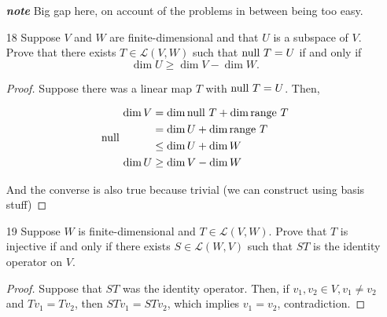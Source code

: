 \begin{enumerate}
\begin{proof}
        The specific non-zero value can be defined using basis stuff, but the details are not too important here. What \emph{is} important is that null and range are both subspaces, so by swapping which is 0 and which is non-zero, we will keep these subspaces.
        
        $\lrange T_2 = \lnull T_1$. $T_2$ will also be not injective because we swap range and null, and we specify that the range of $T_1$ must be non-zero. Now the null space of $(T_1 + T_2) = \{0\}$, which is injective, so we have our proof that it is not closed under addition (and therefore not a subspace).
    \end{proof}

    \item[\emph{\textbf{note}}] Big gap here, on account of the problems in between being too easy.
    
    \item[18] Suppose $V$ and $W$ are finite-dimensional and that $U$ is a subspace of $V$.
    Prove that there exists $T \in \mathcal L(V, W)$ such that $\text{null } T = U$ if and only if
    \[
        \dim U \geq \dim V - \dim W.
    \]

    \begin{proof}
        Suppose there was a linear map $T$ with $\text{null } T = U$. Then, 

        \begin{align*}
            \dim V &= \dim \lnull T + \dim \lrange T \\
            &= \dim U + \dim \lrange T \\
            &\leq \dim U + \dim W \\
            \dim U &\geq \dim V - \dim W
        \end{align*}


        And the converse is also true because trivial (we can construct using basis stuff)
    \end{proof}

    \item[19] Suppose $W$ is finite-dimensional and $T \in \mathcal L(V, W)$. Prove that $T$ is injective
if and only if there exists $S \in \mathcal L(W, V)$ such that $ST$ is the identity operator
on $V$.

    \begin{proof}
        Suppose that $ST$ was the identity operator. Then, if $v_1, v_2 \in V, v_1 \neq v_2$ and $Tv_1 = Tv_2$, then $STv_1 = STv_2$, which implies $v_1 = v_2$, contradiction.


\end{proof}
\end{enumerate}

